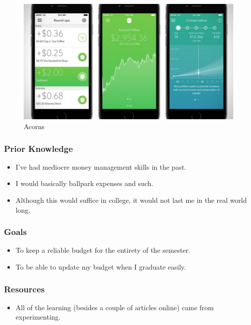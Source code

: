 \documentclass[xclolor=dvipsnames]{beamer}            %
\begin{document}
\begin{darkframes}
\begin{frame}
        \begin{figure}[H]
            \centering
            \includegraphics[height=.65\textheight]{assets/acorns.jpg}
            \caption{Acorns}
            \label{fig:acorns}
        \end{figure}
    \end{frame}

    \begin{frame}
        \frametitle{Prior Knowledge}

        \begin{itemize}
            \item I've had mediocre money management skills in the past.
            \item I would basically ballpark expenses and such.
            \item Although this would suffice in college, it would not last me in the real world long.
        \end{itemize}
    \end{frame}

    \begin{frame}
        \frametitle{Goals}

        \begin{itemize}
            \item To keep a reliable budget for the entirety of the semester.
            \item To be able to update my budget when I graduate easily.
        \end{itemize}
    \end{frame}

    \begin{frame}
        \frametitle{Resources}

        \begin{itemize}
            \item All of the learning (besides a couple of articles online) came from experimenting.
        \end{itemize}
    \end{frame}


\end{darkframes}
\end{document}

